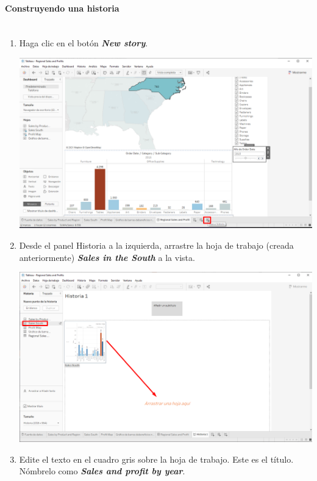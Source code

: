 \documentclass[12pt,letterpaper]{article}
\begin{document}
    \paragraph{\large Construyendo una historia\\ \\}
    \begin{enumerate}
        \item Haga clic en el botón \textit{\textbf{New story}}.
        \begin{center}
            \includegraphics[width=15cm]{./img/img87.png}
        \end{center}
        \item Desde el panel Historia a la izquierda, arrastre la hoja de trabajo (creada anteriormente) \textit{\textbf{Sales in the South}} a la vista.
        \begin{center}
            \includegraphics[width=15cm]{./img/img88.png}
        \end{center}
        \item Edite el texto en el cuadro gris sobre la hoja de trabajo. Este es el título. Nómbrelo como \textit{\textbf{Sales and profit by year}}.

\end{enumerate}
\end{document}
